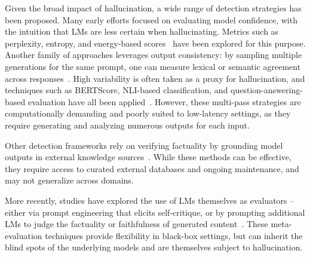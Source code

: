 Given the broad impact of hallucination, a wide range of detection strategies has been proposed. Many early efforts focused on evaluating model confidence, with the intuition that LMs are less certain when hallucinating. Metrics such as perplexity, entropy, and energy-based scores~\citep{ren_out--distribution_2023, malinin_uncertainty_2021, liu_energy-based_2020} have been explored for this purpose. Another family of approaches leverages output consistency: by sampling multiple generations for the same prompt, one can measure lexical or semantic agreement across responses~\citep{lin-etal-2022-truthfulqa, durmus-etal-2020-feqa, scialom-etal-2021-questeval}. High variability is often taken as a proxy for hallucination, and techniques such as BERTScore, NLI-based classification, and question-answering-based evaluation have all been applied~\citep{falke-etal-2019-ranking, maynez-etal-2020-faithfulness, nan-etal-2021-entity, chen2024complexclaimverificationevidence}. However, these multi-pass strategies are computationally demanding and poorly suited to low-latency settings, as they require generating and analyzing numerous outputs for each input.

Other detection frameworks rely on verifying factuality by grounding model outputs in external knowledge sources~\citep{min2023factscorefinegrainedatomicevaluation, huo2023retrievingsupportingevidencellms, chern2023factoolfactualitydetectiongenerative, chen2024complexclaimverificationevidence}. While these methods can be effective, they require access to curated external databases and ongoing maintenance, and may not generalize across domains.

More recently, studies have explored the use of LMs themselves as evaluators -- either via prompt engineering that elicits self-critique, or by prompting additional LMs to judge the factuality or faithfulness of generated content~\citep{xiong2024llmsexpressuncertaintyempirical, kadavath2022languagemodelsmostlyknow, manakul2023selfcheckgptzeroresourceblackboxhallucination, chiang2023largelanguagemodelsalternative, luo2023chatgptfactualinconsistencyevaluator, laban2023llmsfactualreasonersinsights, miao2023selfcheckusingllmszeroshot}. These meta-evaluation techniques provide flexibility in black-box settings, but can inherit the blind spots of the underlying models and are themselves subject to hallucination.


